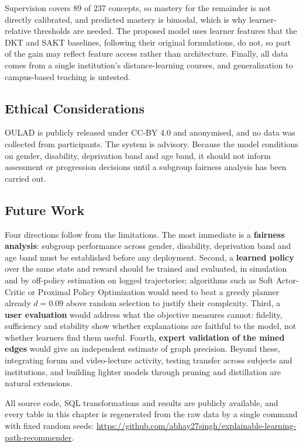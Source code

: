 \documentclass[graybox]{SNmult}
\begin{document}
Supervision covers 89 of 237 concepts, so mastery for the remainder is not directly
calibrated, and predicted mastery is bimodal, which is why learner-relative thresholds are
needed. The proposed model uses learner features that the DKT and SAKT baselines, following
their original formulations, do not, so part of the gain may reflect feature access rather
than architecture. Finally, all data comes from a single institution's distance-learning
courses, and generalization to campus-based teaching is untested.

\subsection{Ethical Considerations}
\label{subsec:ethics}

OULAD is publicly released under CC-BY 4.0 and anonymised, and no data was collected from
participants. The system is advisory. Because the model conditions on gender, disability,
deprivation band and age band, it should not inform assessment or progression decisions
until a subgroup fairness analysis has been carried out.

\subsection{Future Work}
\label{subsec:future}

Four directions follow from the limitations. The most immediate is a \textbf{fairness
analysis}: subgroup performance across gender, disability, deprivation band and age band
must be established before any deployment. Second, a \textbf{learned policy} over the same
state and reward should be trained and evaluated, in simulation and by off-policy
estimation on logged trajectories; algorithms such as Soft Actor-Critic or Proximal Policy
Optimization would need to beat a greedy planner already $d = 0.09$ above random selection
to justify their complexity. Third, a \textbf{user evaluation} would address what the
objective measures cannot: fidelity, sufficiency and stability show whether explanations
are faithful to the model, not whether learners find them useful. Fourth, \textbf{expert
validation of the mined edges} would give an independent estimate of graph precision.
Beyond these, integrating forum and video-lecture activity, testing transfer across
subjects and institutions, and building lighter models through pruning and distillation
are natural extensions.

\begin{acknowledgement}
All source code, SQL transformations and results are publicly available, and every table in
this chapter is regenerated from the raw data by a single command with fixed random seeds:
\url{https://github.com/abhay27singh/explainable-learning-path-recommender}.
\end{acknowledgement}
\end{document}
